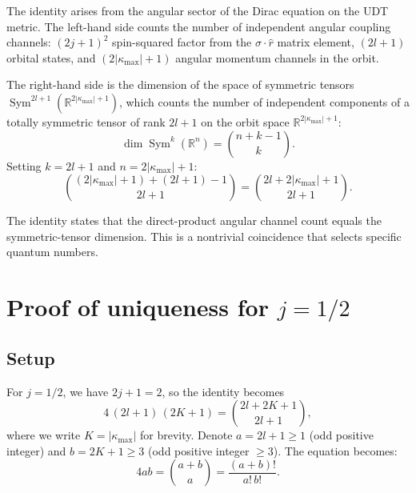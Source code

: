 \documentclass[11pt,letterpaper]{article}
\numberwithin{equation}{section}
\begin{document}
The identity arises from the angular sector of the Dirac equation on the
UDT metric. The left-hand side counts the number of independent angular
coupling channels: $(2j+1)^2$ spin-squared factor from the
$\sigma\cdot\hat{r}$ matrix element, $(2l+1)$ orbital states, and
$(2|\kappa_\mathrm{max}|+1)$ angular momentum channels in the orbit.

The right-hand side is the dimension of the space of symmetric tensors
$\operatorname{Sym}^{2l+1}(\mathbb{R}^{2|\kappa_\mathrm{max}|+1})$, which
counts the number of independent components of a totally symmetric tensor
of rank $2l+1$ on the orbit space $\mathbb{R}^{2|\kappa_\mathrm{max}|+1}$:
\begin{equation}
\label{eq:sym_dim}
  \dim\operatorname{Sym}^k(\mathbb{R}^n) = \binom{n+k-1}{k}.
\end{equation}
Setting $k = 2l+1$ and $n = 2|\kappa_\mathrm{max}|+1$:
\begin{equation}
  \binom{(2|\kappa_\mathrm{max}|+1)+(2l+1)-1}{2l+1}
  = \binom{2l+2|\kappa_\mathrm{max}|+1}{2l+1}.
\end{equation}

The identity states that the direct-product angular channel count equals the
symmetric-tensor dimension. This is a nontrivial coincidence that selects
specific quantum numbers.

\section{Proof of uniqueness for $j = 1/2$}
\label{sec:proof}

\subsection{Setup}

For $j = 1/2$, we have $2j+1 = 2$, so the identity becomes
\begin{equation}
\label{eq:reduced}
  4\,(2l+1)\,(2K+1) = \binom{2l+2K+1}{2l+1},
\end{equation}
where we write $K = |\kappa_\mathrm{max}|$ for brevity. Denote $a = 2l+1 \geq 1$
(odd positive integer) and $b = 2K+1 \geq 3$ (odd positive integer $\geq 3$).
The equation becomes:
\begin{equation}
\label{eq:ab_form}
  4ab = \binom{a+b}{a} = \frac{(a+b)!}{a!\,b!}.
\end{equation}
\end{document}

